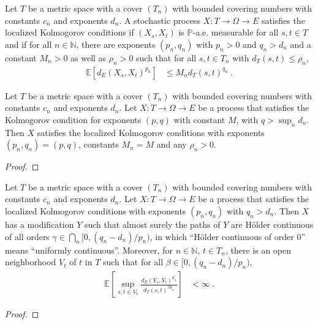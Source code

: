 \begin{definition}\label{def:IsLocalizedKolmogorovProcess}
  \notready
Let $T$ be a metric space with a cover $(T_n)$ with bounded covering numbers with constants $c_n$ and exponents $d_n$.
A stochastic process $X : T \to \Omega \to E$ satisfies the localized Kolmogorov conditions if $(X_s, X_t)$ is $\mathbb{P}$-a.e. measurable for all $s, t \in T$ and if for all $n \in \mathbb{N}$, there are exponents $(p_n, q_n)$ with $p_n > 0$ and $q_n > d_n$ and a constant $M_n > 0$ as well as $\rho_n > 0$ such that for all $s, t \in T_n$ with $d_T(s, t) \le \rho_n$,
\begin{align*}
  \mathbb{E}\left[ d_E(X_s, X_t)^{p_n} \right]
  &\le M_n d_T(s, t)^{q_n}
  \: .
\end{align*}
\end{definition}


\begin{lemma}\label{lem:IsKolmogorovProcess.IsLocalizedKolmogorovProcess}
  \notready
Let $T$ be a metric space with a cover $(T_n)$ with bounded covering numbers with constants $c_n$ and exponents $d_n$.
Let $X : T \to \Omega \to E$ be a process that satisfies the Kolmogorov condition for exponents $(p,q)$ with constant $M$, with $q > \sup_n d_n$.
Then $X$ satisfies the localized Kolmogorov conditions with exponents $(p_n, q_n) = (p, q)$, constants $M_n = M$ and any $\rho_n > 0$.
\end{lemma}

\begin{proof}

\end{proof}


\begin{theorem}\label{thm:localized_holder_modification}
  \notready
Let $T$ be a metric space with a cover $(T_n)$ with bounded covering numbers with constants $c_n$ and exponents $d_n$.
Let $X : T \to \Omega \to E$ be a process that satisfies the localized Kolmogorov conditions with exponents $(p_n, q_n)$ with $q_n > d_n$.
Then $X$ has a modification $Y$ such that almost surely the paths of $Y$ are Hölder continuous of all orders $\gamma \in \bigcap_n [0, (q_n - d_n)/p_n)$, in which ``Hölder continuous of order 0'' means ``uniformly continuous''.
Moreover, for $n \in \mathbb{N}$, $t \in T_n$, there is an open neighborhood $V_t$ of $t$ in $T$ such that for all $\beta \in [0, (q_n - d_n)/p_n)$,
\begin{align*}
  \mathbb{E}\left[ \sup_{s, t \in V_t} \frac{d_E(Y_s, Y_t)^{p_n}}{d_T(s, t)^{\beta p_n}} \right]
  &< \infty
  \: .
\end{align*}
\end{theorem}

\begin{proof}

\end{proof}
